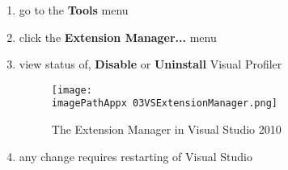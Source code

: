\begin{enumerate}
\item go to the \textbf{Tools} menu

\item click the \textbf{Extension Manager...} menu

\item view status of, \textbf{Disable} or \textbf{Uninstall} Visual Profiler

\begin{figure}[H]
	\centering
		\texttt{[image: \\imagePathAppx 03VSExtensionManager.png]}
		\caption{The Extension Manager in Visual Studio 2010}
	\label{fig:0903VSExtensionManager}
\end{figure}

\item any change requires restarting of Visual Studio
\end{enumerate}




